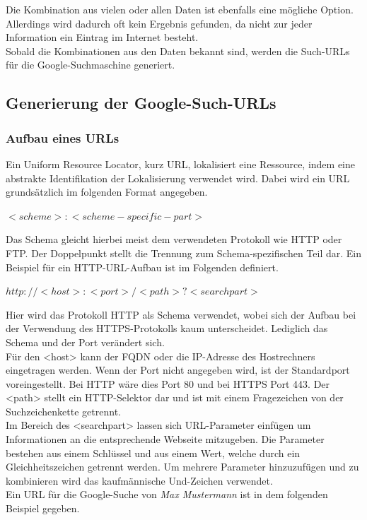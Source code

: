 		
		Die Kombination aus vielen oder allen Daten ist ebenfalls eine mögliche Option. Allerdings wird dadurch oft kein Ergebnis gefunden, da nicht zur jeder Information ein Eintrag im Internet besteht.\\
		Sobald die Kombinationen aus den Daten bekannt sind, werden die Such-URLs für die Google-Suchmaschine generiert.
		\subsection{Generierung der Google-Such-URLs}
			\subsubsection{Aufbau eines URLs}
			\label{subsec:AufbauURL}
			Ein Uniform Resource Locator, kurz URL, lokalisiert eine Ressource, indem eine abstrakte Identifikation der Lokalisierung verwendet wird. Dabei wird ein URL grundsätzlich im folgenden Format angegeben.\cite{RFC1738}
			
			$<scheme>:<scheme-specific-part>$ \cite{RFC1738}
			
			Das Schema gleicht hierbei meist dem verwendeten Protokoll wie HTTP oder FTP. Der Doppelpunkt stellt die Trennung zum Schema-spezifischen Teil dar. Ein Beispiel für ein HTTP-URL-Aufbau ist im Folgenden definiert.\cite{RFC1738}
			
			$http://<host>:<port>/<path>?<searchpart>$\cite{RFC1738}
			
			Hier wird das Protokoll HTTP als Schema verwendet, wobei sich der Aufbau bei der Verwendung des HTTPS-Protokolls kaum unterscheidet. Lediglich das Schema und der Port verändert sich.\\
			Für den <host> kann der FQDN oder die IP-Adresse des Hostrechners eingetragen werden. Wenn der Port nicht angegeben wird, ist der Standardport voreingestellt. Bei HTTP wäre dies Port 80 und bei HTTPS Port 443. Der <path> stellt ein HTTP-Selektor dar und ist mit einem Fragezeichen von der Suchzeichenkette getrennt.\cite{RFC1738}\\ %
			Im Bereich des <searchpart> lassen sich URL-Parameter einfügen um Informationen an die entsprechende Webseite mitzugeben. Die Parameter bestehen aus einem Schlüssel und aus einem Wert, welche durch ein Gleichheitszeichen getrennt werden. Um mehrere Parameter hinzuzufügen und zu kombinieren wird das kaufmännische Und-Zeichen verwendet.\cite{GoogleURL}\\
			Ein URL für die Google-Suche von \textit{Max Mustermann} ist in dem folgenden Beispiel gegeben.
			
